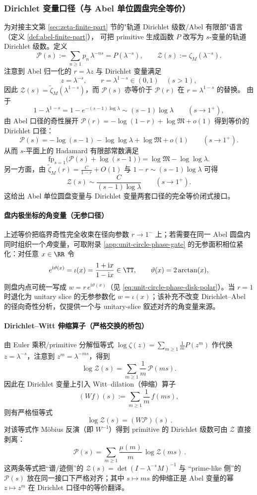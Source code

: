\subsubsection{Dirichlet 变量口径（与 Abel 单位圆盘完全等价）}\label{app:real-input-40-dirichlet}
为对接主文第 \ref{sec:zeta-finite-part} 节的"轨道 Dirichlet 级数/Abel 有限部"语言（定义 \ref{def:abel-finite-part}），
可把 primitive 生成函数 $P$ 改写为 $s$-变量的轨道 Dirichlet 级数。定义
\[
\mathcal{P}(s):=\sum_{n\ge 1}p_n\,\lambda^{-ns}=P(\lambda^{-s}),
\qquad
\mathcal{Z}(s):=\zeta_M(\lambda^{-s}).
\]
注意到 Abel 归一化的 $r=\lambda z$ 与 Dirichlet 变量满足
\[
z=\lambda^{-s},\qquad r=\lambda^{1-s}\in(0,1)\quad(s>1),
\]
因此 $\mathcal{Z}(s)=\widetilde{\zeta}_M(\lambda^{1-s})$，而 $\mathcal{P}(s)$ 亦等价于 $\mathcal{P}(r)$ 在 $r=\lambda^{1-s}$ 的替换。
由于
\[
1-\lambda^{1-s}=1-e^{-(s-1)\log\lambda}\sim (s-1)\log\lambda\qquad(s\to 1^+),
\]
由 Abel 口径的奇性展开
\(
\mathcal{P}(r)=-\log(1-r)+\log\mathfrak{M}+o(1)
\)
得到等价的 Dirichlet 口径：
\[
\mathcal{P}(s)=-\log(s-1)-\log\log\lambda+\log\mathfrak{M}+o(1)\qquad(s\to 1^+).
\]
从而 $s$-平面上的 Hadamard 有限部常数满足
\[
\mathrm{fp}_{s=1}\bigl(\mathcal{P}(s)+\log(s-1)\bigr)=\log\mathfrak{M}-\log\log\lambda.
\]
另一方面，由 $\widetilde{\zeta}_M(r)=\frac{C}{1-r}+O(1)$ 与 $1-r\sim (s-1)\log\lambda$ 可得
\[
\mathcal{Z}(s)\sim \frac{C}{(s-1)\log\lambda}\qquad(s\to 1^+).
\]
这给出 Abel 单位圆盘变量与 Dirichlet 变量两套口径的完全等价闭式接口。

\paragraph{盘内极坐标的角变量（无参口径）}
上述等价把临界奇性完全收束在径向参数 \(r\to 1^{-}\) 上；若需要在同一 Abel 圆盘内同时组织一个\emph{角}变量，可取附录 \ref{app:unit-circle-phase-gate} 的无参面积相位紧化：对任意 \(x\in\RR\) 令
\[
e^{\mathrm{i}\vartheta(x)}=\iota(x)=\frac{1+\mathrm{i}x}{1-\mathrm{i}x}\in\TT,
\qquad
\vartheta(x)=2\arctan(x),
\]
则盘内点可统一写成 \(w=r\,e^{\mathrm{i}\vartheta(x)}\)（见 \eqref{eq:unit-circle-phase-disk-polar}）。当 \(r=1\) 时退化为 unitary slice 的无参参数化 \(w=\iota(x)\)；该补充不改变 Dirichlet--Abel 的径向奇性分析，仅提供一个与 unitary-slice 叙述对齐的角变量来源。

\paragraph{Dirichlet--Witt 伸缩算子（严格交换的桥包）}
由 Euler 乘积/primitive 分解恒等式
\(
\log\zeta(z)=\sum_{m\ge 1}\frac{1}{m}P(z^m)
\)
作代换 $z=\lambda^{-s}$，注意到 $z^m=\lambda^{-ms}$，得到
\[
\log\mathcal{Z}(s)=\sum_{m\ge 1}\frac{1}{m}\,\mathcal{P}(ms).
\]
因此在 Dirichlet 变量上引入 Witt--dilation（伸缩）算子
\[
(Wf)(s):=\sum_{m\ge 1}\frac{1}{m}\,f(ms),
\]
则有严格恒等式
\[
\boxed{\ \log\mathcal{Z}(s)=(W\mathcal{P})(s)\ }.
\]
对该等式作 Möbius 反演（即 $W^{-1}$）得到 primitive 的 Dirichlet 级数可由 $\mathcal{Z}$ 直接剥离：
\[
\boxed{\ \mathcal{P}(s)=\sum_{m\ge 1}\frac{\mu(m)}{m}\,\log\mathcal{Z}(ms)\ }.
\]
这两条等式把“谱/迹侧”的 $\mathcal{Z}(s)=\det(I-\lambda^{-s}M)^{-1}$ 与 “prime-like 侧”的 $\mathcal{P}(s)$ 放在同一接口下严格对齐；其中 $s\mapsto ms$ 的伸缩正是 Abel 变量的幂 $z\mapsto z^m$ 在 Dirichlet 口径中的等价翻译。

